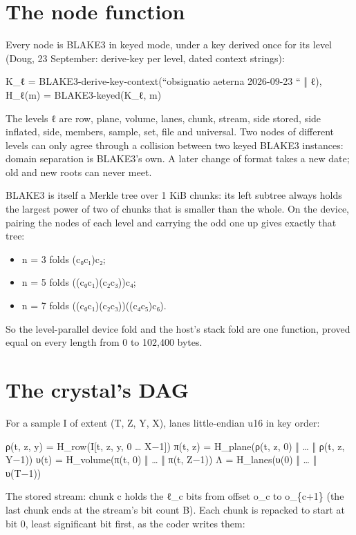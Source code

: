 \section{\texorpdfstring{The node function}{The node function}}

Every node is BLAKE3 in keyed mode, under a key derived once for its level (Doug, 23 September: derive-key per level, dated context strings):

K\_\allowbreak{}ℓ = BLAKE3-derive-key-context(“obsignatio aeterna 2026-09-23 “ ‖ ℓ),  H\_\allowbreak{}ℓ(m) = BLAKE3-keyed(K\_\allowbreak{}ℓ, m)

The levels ℓ are row, plane, volume, lanes, chunk, stream, side stored, side inflated, side, members, sample, set, file and universal. Two nodes of different levels can only agree through a collision between two keyed BLAKE3 instances: domain separation is BLAKE3's own. A later change of format takes a new date; old and new roots can never meet.

BLAKE3 is itself a Merkle tree over 1 KiB chunks: its left subtree always holds the largest power of two of chunks that is smaller than the whole. On the device, pairing the nodes of each level and carrying the odd one up gives exactly that tree:

\begin{itemize}
\item n = 3 folds (c₀c₁)c₂;
\item n = 5 folds ((c₀c₁)(c₂c₃))c₄;
\item n = 7 folds ((c₀c₁)(c₂c₃))((c₄c₅)c₆).
\end{itemize}

So the level-parallel device fold and the host's stack fold are one function, proved equal on every length from 0 to 102,400 bytes.

\section{\texorpdfstring{The crystal's DAG}{The crystal's DAG}}

For a sample I of extent (T, Z, Y, X), lanes little-endian u16 in key order:

ρ(t, z, y) = H\_\allowbreak{}row(I[t, z, y, 0 … X−1]) π(t, z) = H\_\allowbreak{}plane(ρ(t, z, 0) ‖ … ‖ ρ(t, z, Y−1)) υ(t) = H\_\allowbreak{}volume(π(t, 0) ‖ … ‖ π(t, Z−1)) Λ = H\_\allowbreak{}lanes(υ(0) ‖ … ‖ υ(T−1))

The stored stream: chunk c holds the ℓ\_\allowbreak{}c bits from offset o\_\allowbreak{}c to o\_\allowbreak{}\{c+1\} (the last chunk ends at the stream's bit count B). Each chunk is repacked to start at bit 0, least significant bit first, as the coder writes them:

